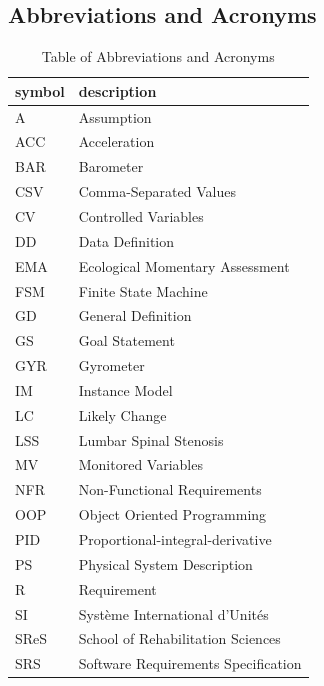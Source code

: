 \documentclass[12pt, titlepage]{article}
\begin{document}
\subsection{Abbreviations and Acronyms}

\renewcommand{\arraystretch}{1.2}
\begin{table}[H]
	\noindent\begin{tabular}{l l} 
	  \toprule		
	  \textbf{symbol} & \textbf{description}\\
	  \midrule 
	  A & Assumption\\
	  ACC & Acceleration\\
	  BAR & Barometer\\
	  CSV & Comma-Separated Values\\
	  CV & Controlled Variables\\
	  DD & Data Definition\\
	  EMA & Ecological Momentary Assessment\\
	  FSM & Finite State Machine\\
	  GD & General Definition\\
	  GS & Goal Statement\\
	  GYR & Gyrometer\\
	  IM & Instance Model\\
	  LC & Likely Change\\
	  LSS & Lumbar Spinal Stenosis\\
	  MV & Monitored Variables\\
	  NFR & Non-Functional Requirements\\
	  OOP & Object Oriented Programming\\
	  PID & Proportional-integral-derivative\\
	  PS & Physical System Description\\
	  R & Requirement\\
	  SI & Syst\`{e}me International d'Unit\'{e}s\\
	  SReS & School of Rehabilitation Sciences\\
	  SRS & Software Requirements Specification\\
	
	  \bottomrule
	\end{tabular}\\
	\caption{\label{abbacr}Table of Abbreviations and Acronyms}  
\end{table}

\newpage

\tableofcontents

\listoftables %
\end{document}
